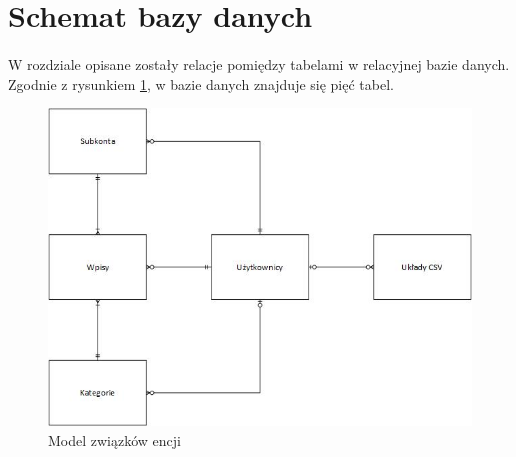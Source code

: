 \documentclass{article}
\begin{document}
	\section{Schemat bazy danych}
	\paragraph{} W rozdziale opisane zostały relacje pomiędzy tabelami w relacyjnej bazie danych. Zgodnie z rysunkiem \ref{fig:er}, w bazie danych znajduje się pięć tabel.
	\begin{figure}[H]
		\centering
		\includegraphics[width=0.8\linewidth]{assets/er.jpg}
		\caption[]{Model związków encji}
		\label{fig:er}
	\end{figure}
	
\end{document}

